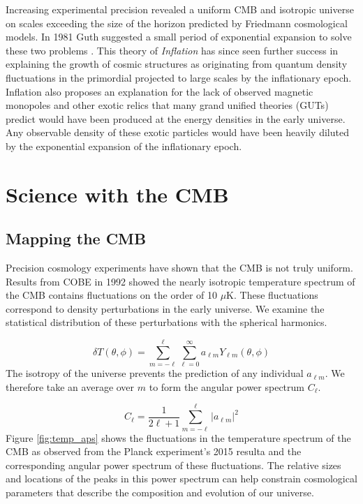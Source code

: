 \documentclass[12pt]{article}
\begin{document}
Increasing experimental precision revealed a uniform CMB and isotropic
universe on scales exceeding the size of the horizon predicted by
Friedmann cosmological models. In 1981 Guth suggested a small period of
exponential expansion to solve these two problems \cite{cite:Guth}. This
theory of \textit{Inflation} has since seen further success in explaining the growth of cosmic structures
as originating from quantum density fluctuations in the primordial projected
to large scales by the inflationary epoch. Inflation also proposes an
explanation for the lack of observed magnetic monopoles and other exotic
relics that many grand unified theories (GUTs) predict would have been
produced at the energy densities in the early universe. Any observable
density of these exotic particles would have been heavily diluted by the
exponential expansion of the inflationary epoch.





\section{Science with the CMB}

\subsection{Mapping the CMB}
Precision cosmology experiments have shown that the CMB is not truly uniform.
Results from COBE in 1992 \cite{cite:COBE} showed the nearly
isotropic temperature spectrum of the CMB contains
fluctuations on the order of 10 $\mu$K. These fluctuations correspond to
density perturbations in the early universe.  We examine the statistical
distribution of these perturbations with the spherical harmonics.


\begin{equation}
	\delta T(\theta,\phi) = \sum _{m=-\ell} ^\ell \sum _{\ell=0} ^\infty
	a_{\ell m}Y_{\ell m}(\theta,\phi)
\end{equation}
The isotropy of the universe prevents the prediction of any individual $a_{\ell
m}$. We therefore take an average over $m$ to form the
angular power spectrum $C_\ell$.

\begin{equation}
	C_{\ell} = \frac{1}{2\ell +1}\sum _{m=-\ell} ^\ell |a_{\ell m}|^2
\end{equation}
Figure \ref{fig:temp_aps} shows the fluctuations in the temperature spectrum
of the CMB as observed from the Planck experiment's 2015 resulta and the
corresponding angular power spectrum of these fluctuations. The relative sizes
and locations of the peaks in this power spectrum can help constrain
cosmological parameters that describe the composition and evolution of our
universe. 
\end{document}
